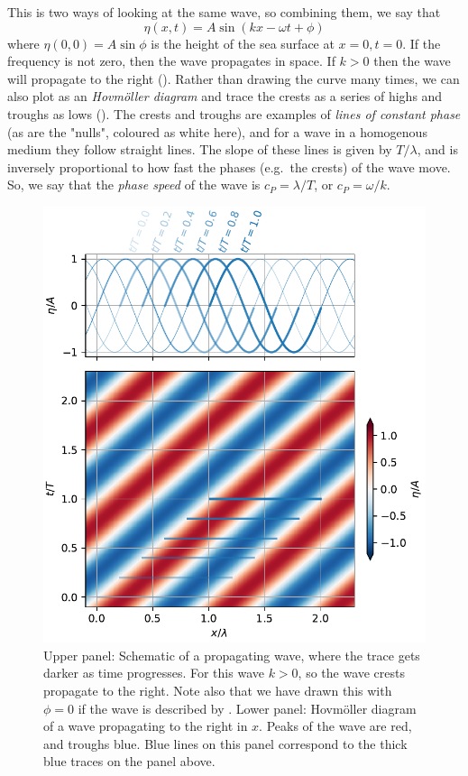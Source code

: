 This is two ways of looking at the same wave, so combining them, we say that 
\begin{equation}
  \eta(x, t) = A \sin ( kx - \omega t + \phi)
  \label{eq:propogatingwave}
\end{equation}
where $\eta(0, 0) = A\sin \phi$ is the height of the sea surface at $x=0, t=0$.  If the frequency is not zero, then the wave propagates in space. If $k>0$ then the wave will propagate to the right ().  Rather than drawing the curve many times, we can also plot as an \emph{Hovm\"oller diagram} and trace the crests as a series of highs and troughs as lows ().  The crests and troughs are examples of \emph{lines of constant phase} (as are the "nulls", coloured as white here), and for a wave in a homogenous medium they follow straight lines.  The slope of these lines is given by $T/\lambda$, and is inversely proportional to how fast the phases (e.g.\ the crests) of the wave move.  So, we say that the \emph{phase speed} of the wave is $c_P = \lambda / T$, or $c_P = \omega / k$.  

\begin{figure}[hbt]
  \begin{center}
  \includegraphics{figs/Waves/WaveHovmoller}
    \caption{Upper panel: Schematic of a propagating wave, where the trace gets darker as time progresses.  For this wave $k>0$, so the wave crests propagate to the right.  Note also that we have drawn this with $\phi=0$ if the wave is described by .  Lower panel: Hovm\"oller diagram of a wave propagating to the right in $x$.  Peaks of the wave are red, and troughs blue. Blue lines on this panel correspond to the thick blue traces on the panel above.   }
    \label{fig:WaveHovmoller}  
  \end{center}
\end{figure}



